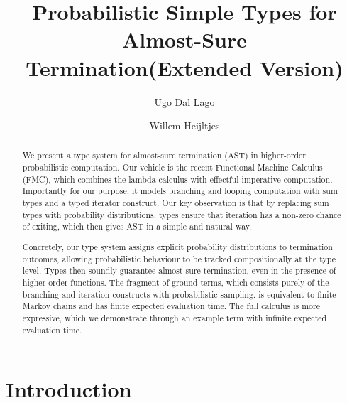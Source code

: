\documentclass[a4paper,UKenglish,cleveref, autoref, thm-restate]{lipics-v2021}
\title{Probabilistic Simple Types for Almost-Sure Termination\ifLongVersion (Extended Version) \fi}
\author{Ugo {Dal Lago}}{University of Bologna, Italy \and INRIA Sophia Antipolis, France}{ugo.dallago@unibo.it}{https://orcid.org/0000-0001-9200-070X}{}
\author{Willem Heijltjes}{University of Bath, United Kingdom \and \url{http://willem.heijltj.es}}{w.b.heijltjes@bath.ac.uk}{https://orcid.org/0009-0001-8941-1150}{}
\begin{document}
\maketitle

\begin{abstract}
We present a type system for almost-sure termination (AST) in higher-order probabilistic computation. Our vehicle is the recent Functional Machine Calculus (FMC), which combines the lambda-calculus with effectful imperative computation. Importantly for our purpose, it models branching and looping computation with sum types and a typed iterator construct. Our key observation is that by replacing sum types with probability distributions, types ensure that iteration has a non-zero chance of exiting, which then gives AST in a simple and natural way. 

Concretely, our type system assigns explicit probability distributions to termination outcomes, allowing probabilistic behaviour to be tracked compositionally at the type level. Types then soundly guarantee almost-sure termination, even in the presence of higher-order functions. The fragment of ground terms, which consists purely of the branching and iteration constructs with probabilistic sampling, is equivalent to finite Markov chains and has finite expected evaluation time. The full calculus is more expressive, which we demonstrate through an example term with infinite expected evaluation time.
\end{abstract}




\section{Introduction}
\end{document}
